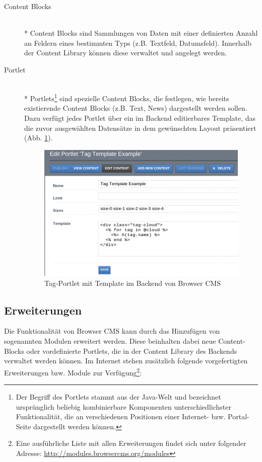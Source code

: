 \begin{description}
\item[Content Blocks]\mbox{~}\\*
Content Blocks sind Sammlungen von Daten mit einer definierten Anzahl an Feldern eines bestimmten Typs (z.B. Textfeld, Datumsfeld). Innerhalb der Content Library können diese verwaltet und angelegt werden.
\item[Portlet]\mbox{~}\\*
Portlets\footnote{Der Begriff des Portlets stammt aus der Java-Welt und bezeichnet ursprünglich beliebig kombinierbare Komponenten unterschiedlichster Funktionalität, die an verschiedenen Positionen einer Internet- bzw. Portal-Seite dargestellt werden können.} sind spezielle Content Blocks, die festlegen, wie bereits existierende Content Blocks (z.B. Text, News) dargestellt werden sollen. Dazu verfügt jedes Portlet über ein im Backend editierbares Template, das die zuvor ausgewählten Datensätze in dem gewünschten Layout präsentiert (Abb. \ref{browsertagportlet}).

\begin{figure}[!h]
\begin{center}
\includegraphics[scale=0.5]{images/analyse/browser/tagportlet.png}
\caption{Tag-Portlet mit Template im Backend von Browser CMS}
\label{browsertagportlet}
\end{center}
\end{figure}


\end{description}

\subsection{Erweiterungen}
Die Funktionalität von Browser CMS kann durch das Hinzufügen von sogenannten Modulen erweitert werden. Diese beinhalten dabei neue Content-Blocks oder vordefinierte Portlets, die in der Content Library des Backends verwaltet werden können. Im Internet stehen zusätzlich folgende vorgefertigten Erweiterungen bzw. Module zur Verfügung\footnote{Eine ausführliche Liste mit allen Erweiterungen findet sich unter folgender Adresse: \href{http://modules.browsercms.org/modules}{http://modules.browsercms.org/modules}}:


